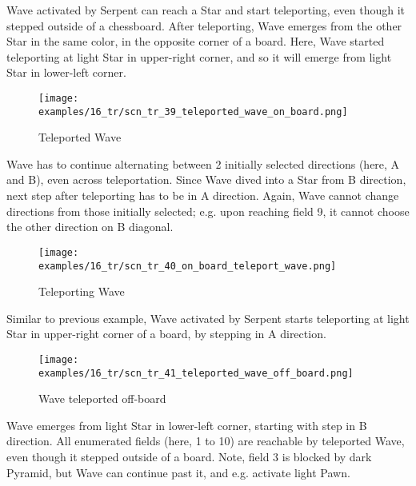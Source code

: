 Wave activated by Serpent can reach a Star and start teleporting, even
though it stepped outside of a chessboard. After teleporting, Wave emerges
from the other Star in the same color, in the opposite corner of a board.
Here, Wave started teleporting at light Star in upper-right corner, and
so it will emerge from light Star in lower-left corner.

\clearpage %

\vspace*{-1.0\baselineskip}
\noindent
\begin{figure}[!h]
\texttt{[image: examples/16\_tr/scn\_tr\_39\_teleported\_wave\_on\_board.png]}
\caption{Teleported Wave}
\label{fig:scn_tr_39_teleported_wave_on_board}
\end{figure}

Wave has to continue alternating between 2 initially selected directions (here,
A and B), even across teleportation. Since Wave dived into a Star from B direction,
next step after teleporting has to be in A direction. Again, Wave cannot change
directions from those initially selected; e.g. upon reaching field 9, it cannot
choose the other direction on B diagonal.

\clearpage %

\vspace*{-1.0\baselineskip}
\noindent
\begin{figure}[!h]
\texttt{[image: examples/16\_tr/scn\_tr\_40\_on\_board\_teleport\_wave.png]}
\caption{Teleporting Wave}
\label{fig:scn_tr_40_on_board_teleport_wave}
\end{figure}

Similar to previous example, Wave activated by Serpent starts teleporting at
light Star in upper-right corner of a board, by stepping in A direction.

\clearpage %

\vspace*{-1.0\baselineskip}
\noindent
\begin{figure}[!h]
\texttt{[image: examples/16\_tr/scn\_tr\_41\_teleported\_wave\_off\_board.png]}
\caption{Wave teleported off-board}
\label{fig:scn_tr_41_teleported_wave_off_board}
\end{figure}

Wave emerges from light Star in lower-left corner, starting with step in B
direction. All enumerated fields (here, 1 to 10) are reachable by teleported
Wave, even though it stepped outside of a board. Note, field 3 is blocked by
dark Pyramid, but Wave can continue past it, and e.g. activate light Pawn.

